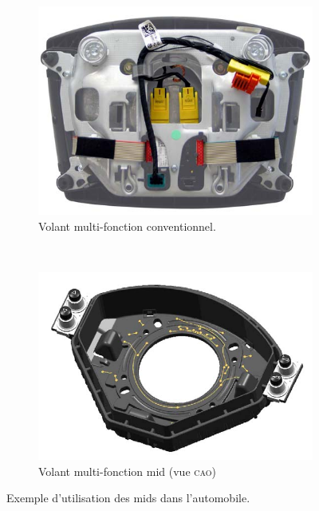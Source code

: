 \begin{figure}[h]
        \centering
        \begin{subfigure}[t]{0.4\textwidth}
                \includegraphics[width=\textwidth]{images/conventional_steering_wheel}
                \caption{Volant multi-fonction conventionnel.}
                \label{fig:conventional-wheel}
        \end{subfigure}%
        ~ 
        \begin{subfigure}[t]{0.4\textwidth}
                \includegraphics[width=\textwidth]{images/mid_steering_wheel}
                \caption{Volant multi-fonction \gls{mid} (vue \textsc{cao})}
                \label{fig:mid-wheel}
        \end{subfigure}
        \caption{Exemple d'utilisation des \glspl{mid} dans l'automobile.}\label{fig:mid-automotive-example}
\end{figure}


